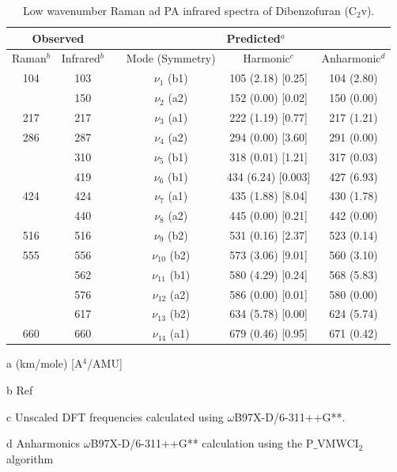 \begin{table}[H]
	\caption{Low wavenumber Raman ad PA infrared spectra of Dibenzofuran (C$_{2}$v).}
	\begin{center}
		\begin{threeparttable}
			\begin{tabular}{c c c c c c}
				\hline
				\multicolumn{ 2}{c}{Observed} & \multicolumn{1}{c}{} & \multicolumn{ 3}{c}{Predicted$^{a}$} \\ \hline
				Raman$^{b}$ & \multicolumn{1}{c}{Infrared$^{b}$} &  & \multicolumn{1}{c}{Mode (Symmetry)} & \multicolumn{1}{c}{Harmonic$^{c}$} & Anharmonic$^{d}$ \\ \hline
		104 & 103 &  & $\nu_{1}$ (b1) & 105 (2.18) [0.25] & 104 (2.80) \\ 
		& 150 &  &  $\nu_{2}$ (a2) & 152 (0.00) [0.02] & 150 (0.00) \\ 
		217 & 217 &  & $\nu_{3}$	(a1) & 	222 (1.19) [0.77] & 		217 (1.21) \\
		286 & 287 &  &$\nu_{4}$ (a2) & 294 (0.00) [3.60] & 291 (0.00) \\ 
		& 310 &  & $\nu_{5}$ (b1) & 318 (0.01) [1.21] & 317 (0.03) \\ 
		& 419 &  & $\nu_{6}$ (b1) & 434 (6.24) [0.003] & 427 (6.93) \\
		424 & 424 &  & $\nu_{7}$ (a1) & 435 (1.88) [8.04] & 430 (1.78) \\ 
		& 440 &  & $\nu_{8}$ (a2) & 445 (0.00) [0.21] & 442 (0.00) \\ 
		516 & 516 &  & $\nu_{9}$ (b2)  & 531 (0.16) [2.37] & 523 (0.14)		\\ 
		555 & 556 &  & $\nu_{10}$ (b2) & 573 (3.06) [9.01] & 560 (3.10) \\ 
		& 562 &  & $\nu_{11}$ (b1) & 580 (4.29) [0.24] & 568 (5.83) \\
		& 576 &  & $\nu_{12}$ (a2) & 586 (0.00) [0.01] & 580 (0.00) \\ 
		& 617 &  & $\nu_{13}$ (b2) & 634 (5.78) [0.00] & 624 (5.74) \\ 
		660 & 660 &  & $\nu_{14}$ (a1)  & 679 (0.46) [0.95] & 671 (0.42) \\		
		\bottomrule	
\end{tabular}

\begin{tablenotes}
	\item[a] (km/mole) [A$^{4}$/AMU]
	\item[b] Ref \cite{klots1996vibrational}
	\item[c] Unscaled DFT frequencies calculated using $\omega$B97X-D/6-311++G**.
	\item[d] Anharmonics $\omega$B97X-D/6-311++G** calculation using the P$\_$VMWCI$_{2}$ algorithm
\end{tablenotes}
\end{threeparttable}
\end{center}
\label{lowfreq-Dibenzofuran}
\end{table}




